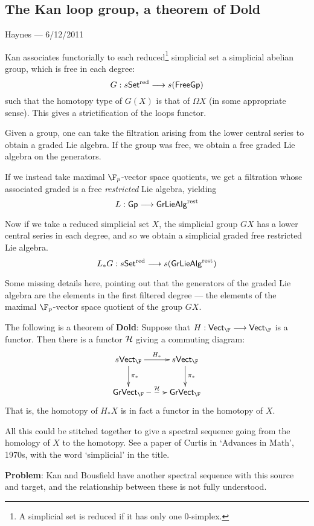 \documentclass[11pt]{article}
\newcommand{\CONVERSATION}[3]{
\subsection*{#1}
\begin{flushright}
{\small #2 --- #3}
\end{flushright}
}
\begin{document}
\pagebreak
\CONVERSATION{The Kan loop group, a theorem of Dold}{Haynes}{6/12/2011}
Kan associates functorially to each reduced\footnote{A simplicial set is reduced if it has only one 0-simplex.} simplicial set a simplicial abelian group, which is free in each degree:
\[G:s\mathsf{Set^{\textup{red}}}\to s(\mathsf{FreeGp})\]
such that the homotopy type of $G(X)$ is that of $\Omega X$ (in some appropriate sense). This gives a strictification of the loops functor.

Given a group, one can take the filtration arising from the lower central series to obtain a graded Lie algebra. If the group was free, we obtain a free graded Lie algebra on the generators.

If we instead take maximal $\F_p$-vector space quotients, we get a filtration whose associated graded is a free \emph{restricted} Lie algebra, yielding
\[L:\mathsf{Gp}\to\mathsf{GrLieAlg}^{\textup{rest}}\]


Now if we take a reduced simplicial set $X$, the simplicial group $GX$ has a lower central series in each degree, and so we obtain a simplicial graded free restricted Lie algebra.
\[L_*G:s\mathsf{Set^{\textup{red}}}\to s(\mathsf{GrLieAlg}^{\textup{rest}}) \]

Some missing details here, pointing out that the generators of the graded Lie algebra are the elements in the first filtered degree --- the elements of the maximal $\F_p$-vector space quotient of the group $GX$.

The following is a theorem of \textbf{Dold}: Suppose that $H:\mathsf{Vect}_\F\to\mathsf{Vect}_\F$ is a functor. Then there is a functor $\calH$ giving a commuting diagram:
\[\xymatrix{
s\mathsf{Vect}_{\F}\ar[r]^{H_*}\ar[d]^{\pi_*}&
s\mathsf{Vect}_{\F}\ar[d]^{\pi_*}\\
\mathsf{GrVect}_{\F}\ar@{-->}[r]^{\calH}&\mathsf{GrVect}_{\F}
}\]
That is, the homotopy of $H_*X$ is in fact a functor in the homotopy of $X$.

All this could be stitched together to give a spectral sequence going from the homology of $X$ to the homotopy. See a paper of Curtis in `Advances in Math', 1970s, with the word `simplicial' in the title.

\textbf{Problem}: Kan and Bousfield have another spectral sequence with this source and target, and the relationship between these is not fully understood.
\end{document}
